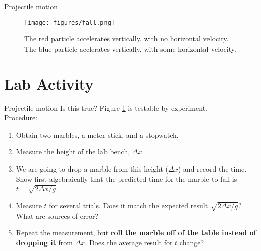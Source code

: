 \documentclass{beamer}
\begin{document}
\begin{frame}{Projectile motion}
\small
\begin{figure}
\centering
\texttt{[image: figures/fall.png]}
\caption{\label{fig:fall} The red particle accelerates vertically, with no horizontal velocity.  The blue particle acclerates vertically, with some horizontal velocity.}
\end{figure}
\end{frame}

\section{Lab Activity}

\begin{frame}{Projectile motion}
Is this true?  Figure \ref{fig:fall} is testable by experiment. \\
\vspace{0.5cm}
\small
Procedure:
\begin{enumerate}
\item Obtain two marbles, a meter stick, and a stopwatch.
\item Measure the height of the lab bench, $\Delta x$.
\item We are going to drop a marble from this height ($\Delta x$) and record the time.  Show first algebraically that the predicted time for the marble to fall is $t = \sqrt{2\Delta x/g}$.
\item Measure $t$ for several trials.  Does it match the expected result $\sqrt{2\Delta x/g}$?  What are sources of error?
\item Repeat the measurement, but \textbf{roll the marble off of the table instead of dropping it} from $\Delta x$.  Does the average result for $t$ change?
\end{enumerate}
\end{frame}
\end{document}
